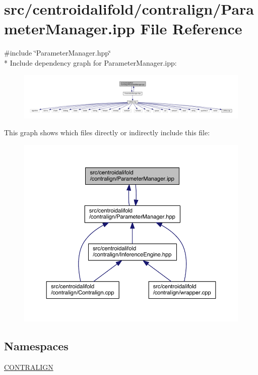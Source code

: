 \hypertarget{centroidalifold_2contralign_2_parameter_manager_8ipp}{\section{src/centroidalifold/contralign/\+Parameter\+Manager.ipp File Reference}
\label{centroidalifold_2contralign_2_parameter_manager_8ipp}
}
{\ttfamily \#include \char`\"{}Parameter\+Manager.\+hpp\char`\"{}}\\*
Include dependency graph for Parameter\+Manager.\+ipp\+:
\nopagebreak
\begin{figure}[H]
\begin{center}
\leavevmode
\includegraphics[width=350pt]{centroidalifold_2contralign_2_parameter_manager_8ipp__incl}
\end{center}
\end{figure}
This graph shows which files directly or indirectly include this file\+:
\nopagebreak
\begin{figure}[H]
\begin{center}
\leavevmode
\includegraphics[width=350pt]{centroidalifold_2contralign_2_parameter_manager_8ipp__dep__incl}
\end{center}
\end{figure}
\subsection*{Namespaces}
\begin{DoxyCompactItemize}
\item 
 \hyperlink{namespace_c_o_n_t_r_a_l_i_g_n}{C\+O\+N\+T\+R\+A\+L\+I\+G\+N}
\end{DoxyCompactItemize}
